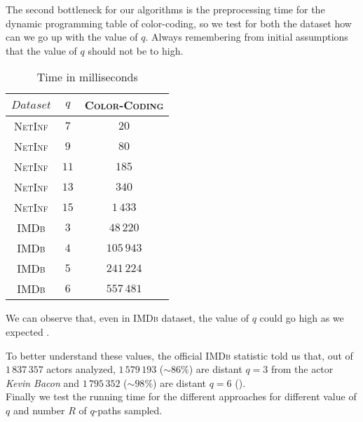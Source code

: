 	The second bottleneck for our algorithms is the preprocessing time for the dynamic programming table of color-coding, so we test for both the dataset how can we go up with the value of $q$. Always remembering from initial assumptions that the value of $q$ should not be to high. 

	\begin{table}[h]
		\centering
		\label{my-label}
		\begin{tabular}{|c|c|c|}
			\hline
			$Dataset$       & $q$  & \textsc{Color-Coding} \\ \hline
			\textsc{NetInf} & $7$  & $20$ \\ \hline
			\textsc{NetInf} & $9$  & $80$ \\ \hline
			\textsc{NetInf} & $11$ & $185$ \\ \hline
			\textsc{NetInf} & $13$ & $340$ \\ \hline
			\textsc{NetInf} & $15$ & $1\,433$ \\ \hline
			\textsc{IMDb}   & $3$  & $48\,220$ \\ \hline
			\textsc{IMDb}   & $4$  & $105\,943$ \\ \hline
			\textsc{IMDb}   & $5$  & $241\,224$ \\ \hline
			\textsc{IMDb}   & $6$  & $557\,481$ \\ \hline
		\end{tabular}
		\caption{Time in milliseconds}
	\end{table}

	We can observe that, even in \textsc{IMDb} dataset, the value of $q$ could go high as we expected . 
	
	To better understand these values, the official \textsc{IMDb} statistic\cite{imdbstat} told us that, out of $1\,837\,357$ actors analyzed, $1\,579\,193$ ($\sim86\%$) are distant $q=3$ from the actor \textit{Kevin Bacon} and $1\,795\,352$ ($\sim98\%$) are distant $q=6$ ().\\
	
	Finally we test the running time for the different approaches for different value of $q$ and number $R$ of $q$-paths sampled.
	
